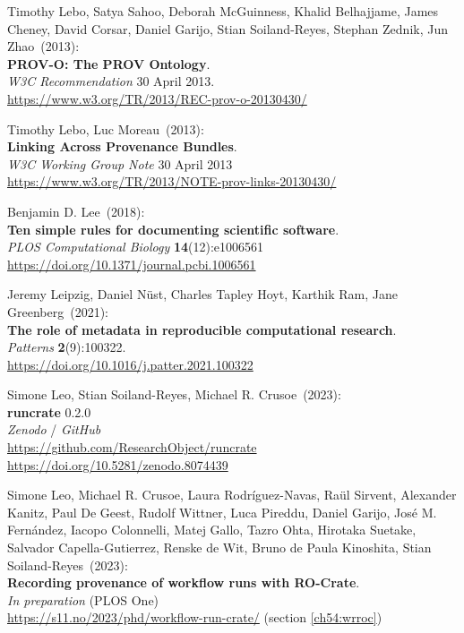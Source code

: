 \begin{thebibliography}{9}
Timothy Lebo, Satya Sahoo, Deborah McGuinness, Khalid Belhajjame, 
James Cheney, David Corsar, Daniel Garijo, Stian Soiland-Reyes, 
Stephan Zednik, Jun Zhao~(2013): \\
\textbf{PROV-O: The PROV Ontology}.\\
\emph{W3C Recommendation} 30 April 2013.\\
\url{https://www.w3.org/TR/2013/REC-prov-o-20130430/}

Timothy Lebo, Luc Moreau~(2013): \\
\textbf{Linking {Across Provenance Bundles}}.\\
\emph{W3C Working Group Note} 30 April 2013 \\
\url{https://www.w3.org/TR/2013/NOTE-prov-links-20130430/}

Benjamin D. Lee~(2018):\\
\textbf{Ten simple rules for documenting scientific software}.\\
\emph{PLOS Computational Biology} \textbf{14}(12):e1006561\\
\url{ https://doi.org/10.1371/journal.pcbi.1006561}

Jeremy Leipzig, Daniel Nüst, Charles Tapley Hoyt, Karthik Ram,
Jane Greenberg~(2021): \\
\textbf{The role of metadata in reproducible computational research}.\\
\emph{Patterns} \textbf{2}(9):100322.\\
\url{https://doi.org/10.1016/j.patter.2021.100322}

Simone Leo, Stian Soiland-Reyes, Michael R. Crusoe~(2023): \\
\textbf{runcrate} 0.2.0\\
\emph{Zenodo} / \emph{GitHub}\\
\url{https://github.com/ResearchObject/runcrate}\\
\url{https://doi.org/10.5281/zenodo.8074439}

Simone Leo, Michael R. Crusoe, Laura Rodríguez-Navas, Raül Sirvent, Alexander Kanitz, Paul De Geest, Rudolf Wittner, Luca Pireddu, Daniel Garijo, José M. Fernández, Iacopo Colonnelli, Matej Gallo, Tazro Ohta, Hirotaka Suetake, Salvador Capella-Gutierrez, Renske de Wit, Bruno de Paula Kinoshita, Stian Soiland-Reyes~(2023): \\
\textbf{Recording provenance of workflow runs with RO-Crate}.\\
\emph{In preparation} (PLOS One)\\
\url{https://s11.no/2023/phd/workflow-run-crate/} 
(section \vref{ch54:wrroc})


\end{thebibliography}
